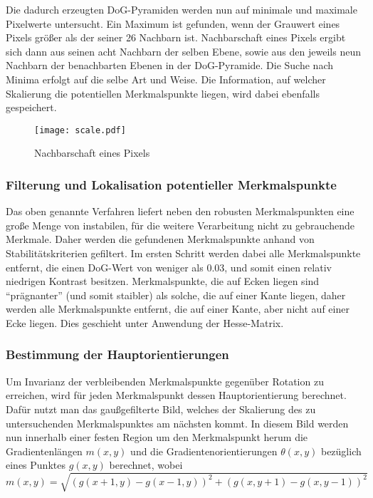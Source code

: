 Die dadurch erzeugten DoG-Pyramiden werden nun auf minimale und maximale Pixelwerte untersucht.
Ein Maximum ist gefunden, wenn der Grauwert eines Pixels größer als der seiner 26 Nachbarn ist. Nachbarschaft eines Pixels ergibt sich dann aus seinen acht Nachbarn der selben Ebene, sowie aus den jeweils neun Nachbarn der benachbarten Ebenen in der DoG-Pyramide.
Die Suche nach Minima erfolgt auf die selbe Art und Weise. Die Information, auf welcher Skalierung die potentiellen Merkmalspunkte liegen, wird dabei ebenfalls gespeichert.
\begin{figure}[H]
  \begin{center}
    \texttt{[image: scale.pdf]}
    \caption{Nachbarschaft eines Pixels}
    \label{fig:neighbor}
  \end{center}
\end{figure}
	\subsubsection{Filterung und Lokalisation potentieller Merkmalspunkte}
		Das oben genannte Verfahren liefert neben den robusten Merkmalspunkten eine große Menge von instabilen, für die weitere Verarbeitung nicht zu gebrauchende Merkmale.
Daher werden die gefundenen Merkmalspunkte anhand von Stabilitätskriterien gefiltert.
Im ersten Schritt werden dabei alle Merkmalspunkte entfernt, die einen DoG-Wert von weniger als 0.03, und somit einen relativ niedrigen Kontrast besitzen.
Merkmalspunkte, die auf Ecken liegen sind "`prägnanter"' (und somit staibler) als solche, die auf einer Kante liegen, daher werden alle Merkmalspunkte entfernt, die auf einer Kante, aber nicht auf einer Ecke liegen.
Dies geschieht unter Anwendung der Hesse-Matrix.
	\subsubsection{Bestimmung der Hauptorientierungen}
		Um Invarianz der verbleibenden Merkmalspunkte gegenüber Rotation zu erreichen, wird für jeden Merkmalspunkt dessen Hauptorientierung berechnet.
Dafür nutzt man das gaußgefilterte Bild, welches der Skalierung des zu untersuchenden Merkmalspunktes am nächsten kommt. In diesem Bild werden nun innerhalb einer festen Region um den Merkmalspunkt herum die Gradientenlängen $m(x, y)$ und die Gradientenorientierungen $\theta (x, y)$ bezüglich eines Punktes $g(x, y)$ berechnet, wobei
\begin{equation*}
m(x, y) = \sqrt{(g(x + 1, y) - g(x - 1, y))^2 +(g(x, y+1) - g(x, y-1))^2}
\end{equation*}

